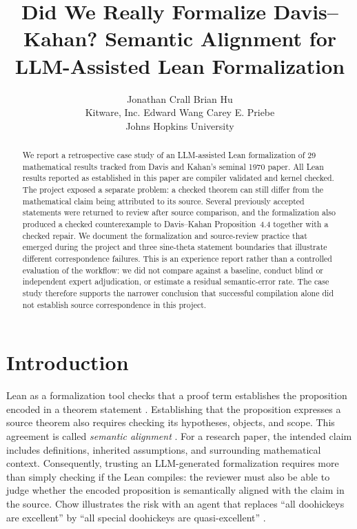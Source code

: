 \documentclass{article}
\title{Did We Really Formalize Davis--Kahan? Semantic Alignment for LLM-Assisted Lean Formalization}
\author{%
  Jonathan Crall \quad Brian Hu \\
  Kitware, Inc.
  \And
  Edward Wang \quad Carey E. Priebe \\
  Johns Hopkins University
}
\date{}
\begin{document}
\maketitle

\begin{abstract}
We report a retrospective case study of an LLM-assisted Lean formalization of
29 mathematical results tracked from Davis and Kahan's seminal 1970 paper.  All
Lean results reported as established in this paper are compiler validated and
kernel checked.  The project exposed a separate problem: a checked theorem can
still differ from the mathematical claim being attributed to its source.
Several previously accepted statements were returned to review after source comparison,
and the formalization also produced a checked counterexample to
Davis--Kahan Proposition~4.4 together with a checked repair.  We document the
formalization and source-review practice that emerged during the project and
three sine-theta statement boundaries that illustrate different correspondence
failures.  This is an experience report rather than a controlled evaluation of
the workflow: we did not compare against a baseline, conduct blind or
independent expert adjudication, or estimate a residual semantic-error rate.
The case study therefore supports the narrower conclusion that successful
compilation alone did not establish source correspondence in this project.
\end{abstract}

\section{Introduction}

Lean as a formalization tool checks that a proof term establishes the proposition encoded in a theorem
statement \citep{demoura2021lean4,mathlib2020}.  Establishing that the proposition
expresses a source theorem also requires checking its hypotheses, objects, and
scope.  This agreement is called \emph{semantic alignment}
\citep{lu2025formalalign}.  For a research paper, the intended claim includes
definitions, inherited assumptions, and surrounding mathematical context.
Consequently, trusting an LLM-generated formalization requires more than simply
checking if the Lean compiles: the reviewer must also be able to judge whether
the encoded proposition is semantically aligned with the claim in the source.
Chow illustrates the risk with an agent that replaces ``all doohickeys are
excellent'' by ``all special doohickeys are quasi-excellent''
\citep{chow2026mindreading}.
\end{document}
